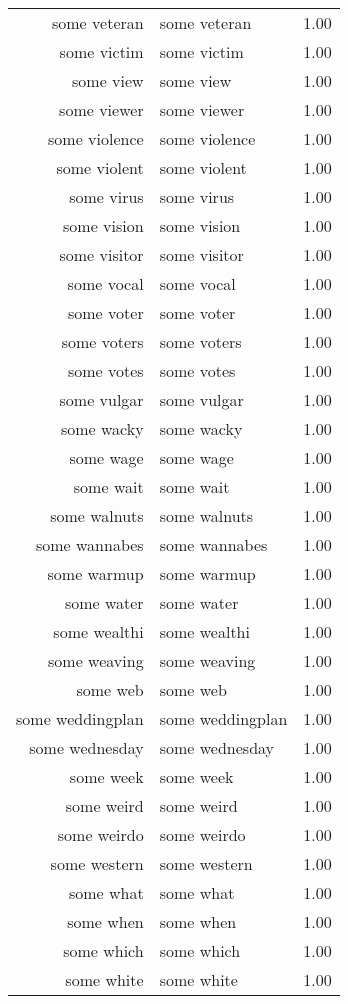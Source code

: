 \begin{table}[ht]
\begin{tabular}{rlr}
  some veteran & some veteran & 1.00 \\ 
  some victim & some victim & 1.00 \\ 
  some view & some view & 1.00 \\ 
  some viewer & some viewer & 1.00 \\ 
  some violence & some violence & 1.00 \\ 
  some violent & some violent & 1.00 \\ 
  some virus & some virus & 1.00 \\ 
  some vision & some vision & 1.00 \\ 
  some visitor & some visitor & 1.00 \\ 
  some vocal & some vocal & 1.00 \\ 
  some voter & some voter & 1.00 \\ 
  some voters & some voters & 1.00 \\ 
  some votes & some votes & 1.00 \\ 
  some vulgar & some vulgar & 1.00 \\ 
  some wacky & some wacky & 1.00 \\ 
  some wage & some wage & 1.00 \\ 
  some wait & some wait & 1.00 \\ 
  some walnuts & some walnuts & 1.00 \\ 
  some wannabes & some wannabes & 1.00 \\ 
  some warmup & some warmup & 1.00 \\ 
  some water & some water & 1.00 \\ 
  some wealthi & some wealthi & 1.00 \\ 
  some weaving & some weaving & 1.00 \\ 
  some web & some web & 1.00 \\ 
  some weddingplan & some weddingplan & 1.00 \\ 
  some wednesday & some wednesday & 1.00 \\ 
  some week & some week & 1.00 \\ 
  some weird & some weird & 1.00 \\ 
  some weirdo & some weirdo & 1.00 \\ 
  some western & some western & 1.00 \\ 
  some what & some what & 1.00 \\ 
  some when & some when & 1.00 \\ 
  some which & some which & 1.00 \\ 
  some white & some white & 1.00 \\ 

\end{tabular}
\end{table}
